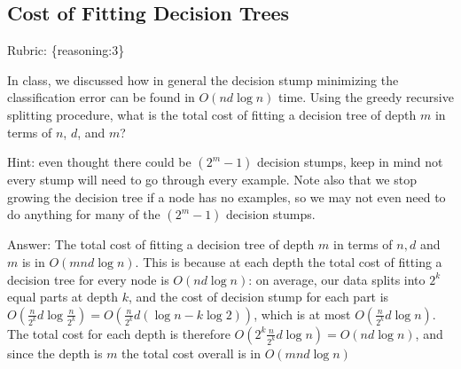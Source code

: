 \documentclass{article}
\def\rubric#1{\gre{Rubric: \{#1\}}}{}
\def\blu#1{{\color{blu}#1}}
\def\gre#1{{\color{gre}#1}}
\def\ans#1{\gre{Answer: #1}}{}
\begin{document}
\subsection{Cost of Fitting Decision Trees}
\rubric{reasoning:3}

In class, we discussed how in general the decision stump minimizing the classification error can be found in $O(nd\log n)$ time.
Using the greedy recursive splitting procedure, \blu{what is the total cost of fitting a decision tree of depth $m$ in terms of $n$, $d$, and $m$?}

Hint: even thought there could be $(2^m-1)$ decision stumps, keep in mind not every stump will need to go through every example. Note also that we stop growing the decision tree if a node has no examples, so we may not even need to do anything for many of the $(2^m-1)$ decision stumps.

\ans{The total cost of fitting a decision tree of depth $m$ in terms of $n, d$ and $m$ is in $O(mnd \log n)$. This is because at each depth the total cost of fitting a decision tree for every node is $O(nd \log n)$: on average, our data splits into $2^k$ equal parts at depth $k$, and the cost of decision stump for each part is $O\left(\frac{n}{2^k} d \log {\frac{n}{2^k}} \right) = O \left(\frac{n}{2^k} d (\log{n} - k \log {2}) \right)$, which is at most $O\left(\frac{n}{2^k}d \log{n}\right)$. The total cost for each depth is therefore $O(2^k \frac{n}{2^k} d \log{n}) = O(n d \log n)$, and since the depth is $m$ the total cost overall is in $O(m n d \log n)$}
\end{document}
